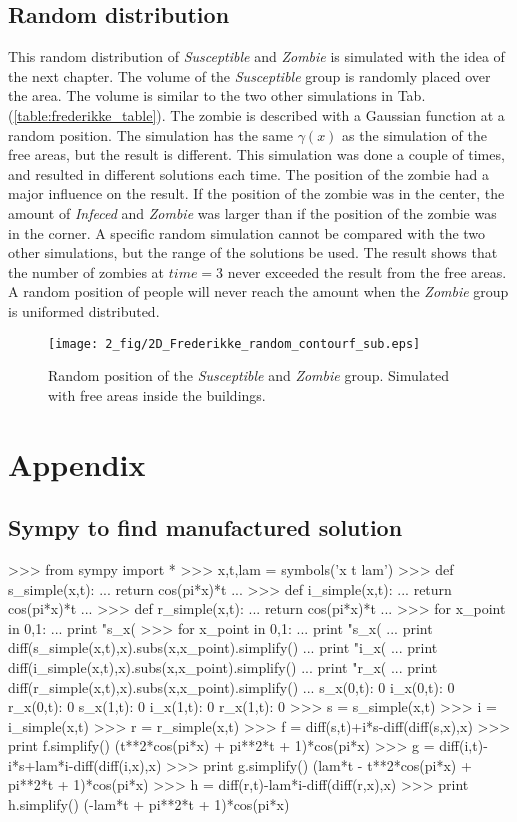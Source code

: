\documentclass[%
twoside,                 %
final,                   %
chapterprefix=true,      %
open=right               %
10pt]{book}
\begin{document}
\noindent
\subsection{Random distribution}
This random distribution of \emph{Susceptible} and \emph{Zombie} is simulated with the idea of the next chapter. The volume of the \emph{Susceptible} group is randomly placed over the area. The volume is similar to the two other simulations in Tab.(\ref{table:frederikke_table}). The zombie is described with a Gaussian function at a random position. The simulation has the same $\gamma(x)$ as the simulation of the free areas, but the result is different. This simulation was done a couple of times, and resulted in different solutions each time. The position of the zombie had a major influence on the result. If the position of the zombie was in the center, the amount of \emph{Infeced} and \emph{Zombie} was larger than if the position of the zombie was in the corner. A specific random simulation cannot be compared with the two other simulations, but the range of the solutions be used. The result shows that the number of zombies at $time=3$ never exceeded the result from the free areas. A random position of people will never reach the amount when the \emph{Zombie} group is uniformed distributed.


\begin{figure}[ht]
  \centerline{\texttt{[image: 2\_fig/2D\_Frederikke\_random\_contourf\_sub.eps]}}
  \caption{
  \label{fig:frederikke_random} Random position of the \emph{Susceptible} and \emph{Zombie} group. Simulated with free areas inside the buildings.
  }
\end{figure}


\section{Appendix}
\subsection{Sympy to find manufactured solution}

\bpycod
>>> from sympy import *
>>> x,t,lam = symbols('x t lam')
>>> def s_simple(x,t):
...     return cos(pi*x)*t
... 
>>> def i_simple(x,t):
...     return cos(pi*x)*t
... 
>>> def r_simple(x,t):
...     return cos(pi*x)*t
... 
>>> for x_point in 0,1:
...     print "s_x(%
>>> for x_point in 0,1:
...     print "s_x(%
...     print diff(s_simple(x,t),x).subs(x,x_point).simplify()
...     print "i_x(%
...     print diff(i_simple(x,t),x).subs(x,x_point).simplify()
...     print "r_x(%
...     print diff(r_simple(x,t),x).subs(x,x_point).simplify()
... 
s_x(0,t):  0
i_x(0,t):  0
r_x(0,t):  0
s_x(1,t):  0
i_x(1,t):  0
r_x(1,t):  0
>>> s = s_simple(x,t)
>>> i = i_simple(x,t)
>>> r = r_simple(x,t)
>>> f = diff(s,t)+i*s-diff(diff(s,x),x)
>>> print f.simplify()
(t**2*cos(pi*x) + pi**2*t + 1)*cos(pi*x)
>>> g = diff(i,t)-i*s+lam*i-diff(diff(i,x),x)
>>> print g.simplify()
(lam*t - t**2*cos(pi*x) + pi**2*t + 1)*cos(pi*x)
>>> h = diff(r,t)-lam*i-diff(diff(r,x),x)
>>> print h.simplify()
(-lam*t + pi**2*t + 1)*cos(pi*x)
\epycod
\end{document}
